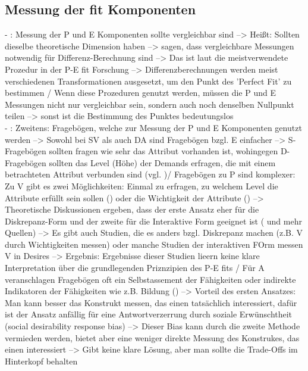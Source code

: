 \subsection{Messung der fit Komponenten}
\label{ch:notizen:methodischeProbleme:messungDerFitKomponenten}
- \cite[S. 8]{edwards:1990}: Messung der P und E Komponenten sollte vergleichbar sind --> Heißt: Sollten dieselbe theoretische Dimension haben --> \textcite{copingAndAdaption:1974} sagen, dass vergleichbare Messungen notwendig für Differenz-Berechnung sind --> Das ist laut \textcite{jobDemandsAndWorkerHealth:1975} die meistverwendete Prozedur in der P-E fit Forschung --> Differenzberechnungen werden meist verschiedenen Transformationen ausgesetzt, um den Punkt des 'Perfect Fit' zu bestimmen \textcite{jobDemandsAndWorkerHealth:1975} / Wenn diese Prozeduren genutzt werden, müssen die P und E Messungen nicht nur vergleichbar sein, sondern auch noch denselben Nullpunkt teilen --> sonst ist die Bestimmung des Punktes bedeutungslos \\
- \cite[S. 8]{edwards:1990}: Zweitens: Fragebögen, welche zur Messung der P und E Komponenten genutzt werden --> Sowohl bei SV als auch DA sind Fragebögen bzgl. E einfacher --> S-Fragebögen sollten fragen wie sehr das Attribut vorhanden ist, wohingegen D-Fragebögen sollten das Level (Höhe) der Demands erfragen, die mit einem betrachteten Attribut verbunden sind (vgl. \textcite{jobDemandsAndWorkerHealth:1975})/ Fragebögen zu P sind komplexer: Zu V gibt es zwei Möglichkeiten: Einmal zu erfragen, zu welchem Level die Attribute erfüllt sein sollen (\textcite{jobDemandsAndWorkerHealth:1975}) oder die Wichtigkeit der Attribute (\textcite{workAdjustment:1964}) --> Theoretische Diskussionen ergeben, dass der erste Ansatz eher für die Diskrepanz-Form und der zweite für die Interaktive Form geeignet ist (\textcite{copingAndAdaption:1974} und mehr Quellen) --> Es gibt auch Studien, die es anders bzgl. Diskrepanz machen (z.B. V durch Wichtigkeiten messen) oder manche Studien der interaktiven FOrm messen V in Desires --> Ergebnis: Ergebnisse dieser Studien lieern keine klare Interpretation über die grundlegenden Priznzipien des P-E fits / Für A veranschlagen Fragebögen oft ein Selbstassement der Fähigkeiten  oder indirekte Indikatoren der Fähigkeiten wie z.B. Bildung (\textcite{jobDemandsAndWorkerHealth:1975}) --> Vorteil des ersten Ansatzes: Man kann besser das Konstrukt messen, das einen tatsächlich interessiert, dafür ist der Ansatz anfällig für eine Antwortverzerrung durch soziale Erwünschtheit (social desirability response bias) --> Dieser Bias kann durch die zweite Methode vermieden werden, bietet aber eine weniger direkte Messung des Konstrukes, das einen interessiert --> Gibt keine klare Lösung, aber man sollte die Trade-Offs im Hinterkopf behalten \\
